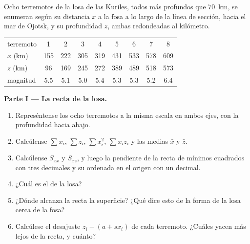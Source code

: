 \begin{problem}
\label{pb:b1:active-margins:1}
Ocho terremotos de la losa de las Kuriles, todos más profundos que \qty{70}{km}, se enumeran según su distancia $x$ a la fosa a lo largo de la
línea de sección, hacia el mar de Ojotsk, y su profundidad $z$, ambas redondeadas al kilómetro.

\begin{center}
\small
\begin{tabular}{lcccccccc}
\hline
terremoto & 1 & 2 & 3 & 4 & 5 & 6 & 7 & 8\\
$x$ (\unit{km}) & 155 & 222 & 305 & 319 & 431 & 533 & 578 & 609\\
$z$ (\unit{km}) & 96 & 169 & 245 & 272 & 389 & 489 & 518 & 573\\
magnitud & 5.5 & 5.1 & 5.0 & 5.4 & 5.3 & 5.3 & 5.2 & 6.4\\
\hline
\end{tabular}
\end{center}

\medskip
\noindent\textbf{Parte I --- La recta de la losa.}
\begin{enumerate}
  \item Represéntense los ocho terremotos a la misma escala en ambos ejes, con la profundidad hacia abajo.
  \item Calcúlense $\sum x_i$, $\sum z_i$, $\sum x_i^2$, $\sum x_i z_i$ y las medias $\bar x$ y $\bar z$.
  \item Calcúlense $S_{xx}$ y $S_{xz}$, y luego la pendiente de la recta de mínimos cuadrados con tres decimales y su ordenada en el origen con un decimal.
  \item ¿Cuál es el  de la losa?
  \item ¿Dónde alcanza la recta la superficie? ¿Qué dice esto de la forma de la losa cerca de la fosa?
  \item Calcúlese el desajuste $z_i - (a + s x_i)$ de cada terremoto. ¿Cuáles yacen más lejos de la recta, y cuánto?
\end{enumerate}


\end{problem}
